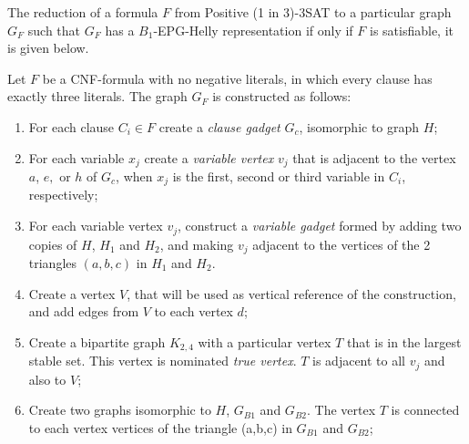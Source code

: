 \documentclass[runningheads]{llncs}
\begin{document}
 


The reduction of a formula $F$ from  {\sc Positive (1 in 3)-3SAT}  to a particular graph $G_F$ such that $G_F$ has a $B_{1}$-EPG-Helly representation if only if $F$ is satisfiable, it is given below.

\begin{definition}\label{sec:reducao}
Let $F$ be a CNF-formula with no negative literals, in which every clause has exactly three literals. The graph $G_F$ is constructed as follows:

\begin{enumerate}
\item For each clause $C_i \in F$ create a  \textit{clause gadget} $G_{c}$, isomorphic to  graph $H$;

\item For each variable $x_{j}$ create a \emph{variable vertex} $v_{j}$ that is adjacent to the vertex $a$, $e,$ or $h$ of $G_c$, when $x_{j}$ is the first, second or third variable in $C_i$, respectively;

\item For each variable vertex $v_{j}$, construct a \emph{variable gadget} formed by adding two copies of $H$, $H_1$ and $H_2$, and making $v_j$ adjacent to the vertices of the 2 triangles $(a, b, c)$ in  $H_1$ and $H_2$.



\item Create a vertex $V$, that will be used as vertical reference of the construction, and add edges from $V$ to each vertex  $d$;%

\item Create a bipartite graph $K_{2,4}$ with a particular vertex $T$ that is in the largest stable set. This vertex is nominated \emph{true vertex}. $T$ is adjacent to all $v_{j}$ and also to $V$;

\item Create two  graphs isomorphic to $H$, $G_{B1}$ and $G_{B2}$. The vertex $T$ is connected to each vertex vertices of the triangle (a,b,c) in $G_{B1}$ and $G_{B2}$;



\end{enumerate}
\end{definition}
\end{document}
